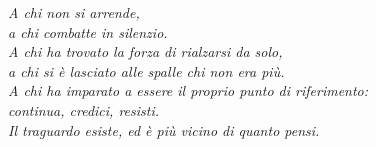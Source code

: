 \cleardoublepage
{}
\thispagestyle{empty}

\vspace*{5cm}

\begin{flushright}
    \textit{A chi non si arrende,\\
    a chi combatte in silenzio.\\
    A chi ha trovato la forza di rialzarsi da solo,\\
    a chi si è lasciato alle spalle chi non era più.\\
    A chi ha imparato a essere il proprio punto di riferimento:\\
    continua, credici, resisti.\\
    Il traguardo esiste, ed è più vicino di quanto pensi.}
\end{flushright}

